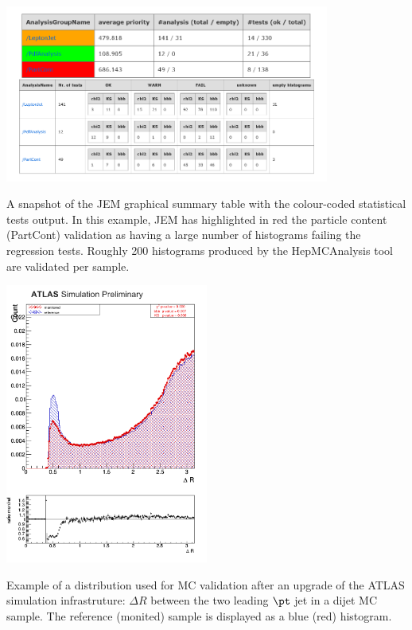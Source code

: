\bfig[t!]
\centering
\includegraphics[width=0.8\textwidth]{figures/EvtGen/jem1.png}
\captionsetup{width=0.85\textwidth} \caption{\small A snapshot of the JEM graphical summary table with the colour-coded statistical tests output. In this example,
JEM has highlighted in red the particle content (PartCont) validation as having a large number of histograms failing the regression tests. Roughly 200 histograms produced by the HepMCAnalysis tool are validated per sample.}
\label{sec:evtgen:fig:jemss}
\efig



\bfig[h!]
\centering
\includegraphics[width=0.5\textwidth]{figures/EvtGen/jem2.png}
\captionsetup{width=0.85\textwidth} \caption{\small Example of a distribution used for MC validation after an upgrade of the ATLAS simulation infrastruture: $\Delta R$ between the two leading $\pt$ jet in a dijet MC sample. The reference (monited) sample is displayed as a blue (red) histogram.}
\label{sec:evtgen:fig:jem}
\efig